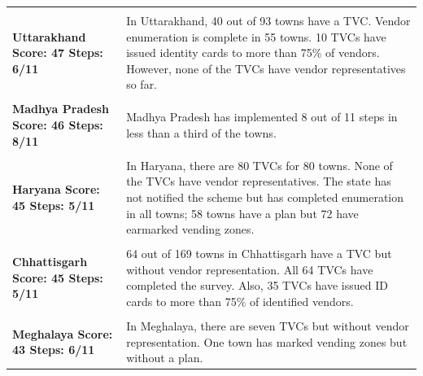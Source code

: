 \documentclass[a4paper, 12pt, twoside, table]{article}
\begin{document}
{\begin{longtable}[l]{>{\raggedright}p{4cm}>{\raggedright\arraybackslash}p{10cm}}
\cellcolor{SVACyellow1} & \cellcolor{SVACyellow2} \\

\cellcolor{SVACyellow1}\bf{Uttarakhand}
\newline
\bf{Score: 47}
\newline
\bf{Steps: 6/11} & \cellcolor{SVACyellow2}In Uttarakhand, 40 out of 93 towns have a TVC. Vendor enumeration is complete in 55 towns. 10 TVCs have issued identity cards to more than 75\% of vendors. However, none of the TVCs have vendor representatives so far. \\

\cellcolor{SVACyellow1} & \cellcolor{SVACyellow2} \\

\cellcolor{SVACyellow1}\bf{Madhya Pradesh}
\newline
\bf{Score: 46}
\newline
\bf{Steps: 8/11} & \cellcolor{SVACyellow2}Madhya Pradesh has implemented 8 out of 11 steps in less than a third of the towns. \\

\cellcolor{SVACyellow1} & \cellcolor{SVACyellow2} \\

\cellcolor{SVACyellow1}\bf{Haryana}
\newline
\bf{Score: 45}
\newline
\bf{Steps: 5/11} & \cellcolor{SVACyellow2}In Haryana, there are 80 TVCs for 80 towns. None of the TVCs have vendor representatives. The state has not notified the scheme but has completed enumeration in all towns; 58 towns have a plan but 72 have earmarked vending zones. \\

\cellcolor{SVACyellow1} & \cellcolor{SVACyellow2} \\

\cellcolor{SVACyellow1}\bf{Chhattisgarh}
\newline
\bf{Score: 45}
\newline
\bf{Steps: 5/11} & \cellcolor{SVACyellow2}64 out of 169 towns in Chhattisgarh have a TVC but without vendor representation. All 64 TVCs have completed the survey. Also, 35 TVCs have issued ID cards to more than 75\% of identified vendors. \\

\cellcolor{SVACyellow1} & \cellcolor{SVACyellow2} \\

\cellcolor{SVACyellow1}\bf{Meghalaya}
\newline
\bf{Score: 43}
\newline
\bf{Steps: 6/11} & \cellcolor{SVACyellow2}In Meghalaya, there are seven TVCs but without vendor representation. One town has marked vending zones but without a plan. \\


\end{longtable}}
\end{document}

